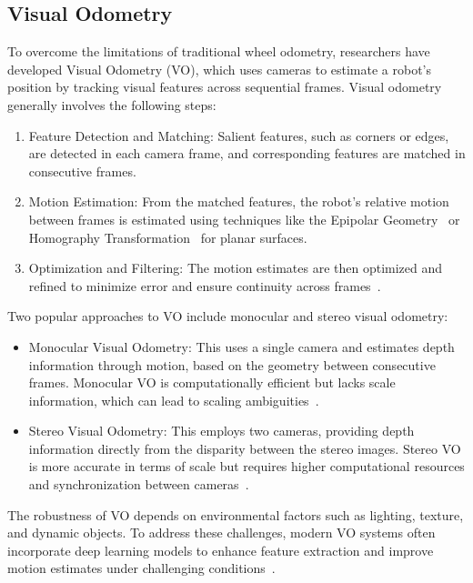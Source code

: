 \subsection{Visual Odometry}

To overcome the limitations of traditional wheel odometry, researchers have developed Visual Odometry (VO), which uses cameras to estimate a robot’s position by tracking visual features across sequential frames. Visual odometry generally involves the following steps:

\begin{enumerate} 
    \item Feature Detection and Matching: Salient features, such as corners or edges, are detected in each camera frame, and corresponding features are matched in consecutive frames.
    \item Motion Estimation: From the matched features, the robot’s relative motion between frames is estimated using techniques like the Epipolar Geometry~\cite{epipolar_geometry} or Homography Transformation~\cite{homography_transformation} for planar surfaces.
    \item Optimization and Filtering: The motion estimates are then optimized and refined to minimize error and ensure continuity across frames~\cite{visual_odometry}.
\end{enumerate}

Two popular approaches to VO include monocular and stereo visual odometry:
\begin{itemize}
    \item Monocular Visual Odometry: This uses a single camera and estimates depth information through motion, based on the geometry between consecutive frames. Monocular VO is computationally efficient but lacks scale information, which can lead to scaling ambiguities~\cite{monocular_VO}.
    \item Stereo Visual Odometry: This employs two cameras, providing depth information directly from the disparity between the stereo images. Stereo VO is more accurate in terms of scale but requires higher computational resources and synchronization between cameras~\cite{stereo_VO}.
\end{itemize}

The robustness of VO depends on environmental factors such as lighting, texture, and dynamic objects. To address these challenges, modern VO systems often incorporate deep learning models to enhance feature extraction and improve motion estimates under challenging conditions~\cite{deepVO}.

